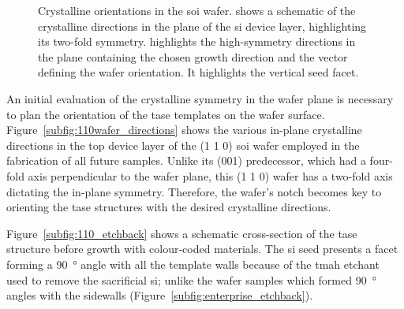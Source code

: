 \begin{figure}
{
    }
    \caption{Crystalline orientations in the \hkl[1 1 0] \acs{soi} wafer.  shows a schematic of the crystalline directions in the plane of the \acs{si} device layer, highlighting its two-fold symmetry.  highlights the high-symmetry directions in the  plane containing the chosen  growth direction and the \hkl[1 1 0] vector defining the wafer orientation. It highlights the vertical  seed facet.}
    \label{fig:110_wafer_properties}
\end{figure}

An initial evaluation of the crystalline symmetry in the wafer plane is necessary to plan the orientation of the \acf{tase} templates on the wafer surface. Figure~\ref{subfig:110wafer_directions} shows the various in-plane crystalline directions in the top device layer of the \hkl(1 1 0) \acs{soi} wafer employed in the fabrication of all future samples. Unlike its \hkl(001) predecessor, which had a four-fold axis perpendicular to the wafer plane, this \hkl(1 1 0) wafer has a two-fold axis dictating the in-plane symmetry. Therefore, the wafer's notch becomes key to orienting the \acs{tase} structures with the desired crystalline directions.
\par
Figure~\ref{subfig:110_etchback} shows a schematic cross-section of the \acs{tase} structure before growth with colour-coded materials. The \acs{si} seed presents a  facet forming a \qty{90}{\degree} angle with all the template walls because of the \acs{tmah} etchant used to remove the sacrificial \acl{si}; unlike the  wafer samples which formed \qty{90}{\degree} angles with the sidewalls (Figure~\ref{subfig:enterprise_etchback}).

